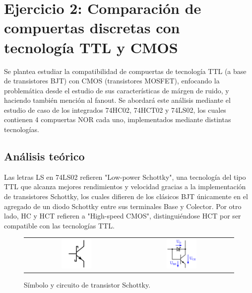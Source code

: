\section{Ejercicio 2: Comparaci\'on de compuertas discretas con tecnolog\'ia TTL y CMOS}
Se plantea estudiar la compatibilidad de compuertas de tecnología TTL (a base de transistores BJT) con CMOS (transistores MOSFET), enfocando la problemática desde el 
estudio de sus características de márgen de ruido, y haciendo también mención al fanout. 
Se abordará este análisis mediante el estudio de caso de los integrados 74HC02, 74HCT02 y 74LS02, los cuales contienen 4 compuertas NOR cada uno, implementados mediante 
distintas tecnologías.

\subsection{Análisis teórico}
Las letras LS en 74LS02 refieren "Low-power Schottky", una tecnología del tipo TTL que alcanza mejores rendimientos y velocidad gracias a la implementación de 
transistores Schottky, los cuales difieren de los clásicos BJT únicamente en el agregado de un diodo Schottky entre sus terminales Base y Colector.
Por otro lado, HC y HCT refieren a "High-speed CMOS", distinguiéndose HCT por ser compatible con las tecnologías TTL.

\begin{figure}[H]
    \centering
    \begin{tabular}{c c}
        \includegraphics[width=0.3\textwidth]{../EJ2/Recursos/schottky_transistor_symbol} &
        \includegraphics[width=0.3\textwidth]{../EJ2/Recursos/schottky_transistor_circuit}
    \end{tabular}
    \caption{Símbolo y circuito de transistor Schottky.}
    \label{fig:schottky_transistor_symbol_and_circuit_ex5}
\end{figure}


